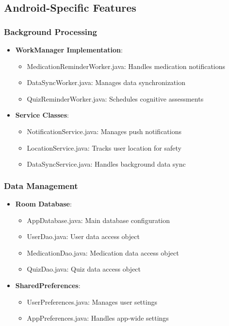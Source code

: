 \subsection{Android-Specific Features}
\subsubsection{Background Processing}
\begin{itemize}
    \item \textbf{WorkManager Implementation}:
    \begin{itemize}
        \item MedicationReminderWorker.java: Handles medication notifications
        \item DataSyncWorker.java: Manages data synchronization
        \item QuizReminderWorker.java: Schedules cognitive assessments
    \end{itemize}
    
    \item \textbf{Service Classes}:
    \begin{itemize}
        \item NotificationService.java: Manages push notifications
        \item LocationService.java: Tracks user location for safety
        \item DataSyncService.java: Handles background data sync
    \end{itemize}
\end{itemize}

\subsubsection{Data Management}
\begin{itemize}
    \item \textbf{Room Database}:
    \begin{itemize}
        \item AppDatabase.java: Main database configuration
        \item UserDao.java: User data access object
        \item MedicationDao.java: Medication data access object
        \item QuizDao.java: Quiz data access object
    \end{itemize}
    
    \item \textbf{SharedPreferences}:
    \begin{itemize}
        \item UserPreferences.java: Manages user settings
        \item AppPreferences.java: Handles app-wide settings
    \end{itemize}
\end{itemize}

